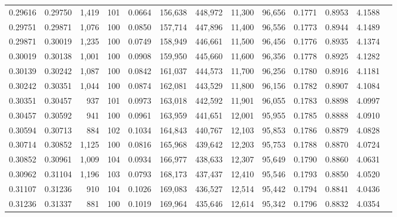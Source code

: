 \begin{tabular}{rrrrrrrrrrrrr}
0.29616 & 0.29750 & 1,419 & 101 &                                     0.0664 & 156,638 & 448,972 &  11,300 &  96,656 & 0.1771 & 0.8953 & 4.1588 \\
0.29751 & 0.29871 & 1,076 & 100 &                                     0.0850 & 157,714 & 447,896 &  11,400 &  96,556 & 0.1773 & 0.8944 & 4.1489 \\
0.29871 & 0.30019 & 1,235 & 100 &                                     0.0749 & 158,949 & 446,661 &  11,500 &  96,456 & 0.1776 & 0.8935 & 4.1374 \\
0.30019 & 0.30138 & 1,001 & 100 &                                     0.0908 & 159,950 & 445,660 &  11,600 &  96,356 & 0.1778 & 0.8925 & 4.1282 \\
0.30139 & 0.30242 & 1,087 & 100 &                                     0.0842 & 161,037 & 444,573 &  11,700 &  96,256 & 0.1780 & 0.8916 & 4.1181 \\
0.30242 & 0.30351 & 1,044 & 100 &                                     0.0874 & 162,081 & 443,529 &  11,800 &  96,156 & 0.1782 & 0.8907 & 4.1084 \\
0.30351 & 0.30457 &   937 & 101 &                                     0.0973 & 163,018 & 442,592 &  11,901 &  96,055 & 0.1783 & 0.8898 & 4.0997 \\
0.30457 & 0.30592 &   941 & 100 &                                     0.0961 & 163,959 & 441,651 &  12,001 &  95,955 & 0.1785 & 0.8888 & 4.0910 \\
0.30594 & 0.30713 &   884 & 102 &                                     0.1034 & 164,843 & 440,767 &  12,103 &  95,853 & 0.1786 & 0.8879 & 4.0828 \\
0.30714 & 0.30852 & 1,125 & 100 &                                     0.0816 & 165,968 & 439,642 &  12,203 &  95,753 & 0.1788 & 0.8870 & 4.0724 \\
0.30852 & 0.30961 & 1,009 & 104 &                                     0.0934 & 166,977 & 438,633 &  12,307 &  95,649 & 0.1790 & 0.8860 & 4.0631 \\
0.30962 & 0.31104 & 1,196 & 103 &                                     0.0793 & 168,173 & 437,437 &  12,410 &  95,546 & 0.1793 & 0.8850 & 4.0520 \\
0.31107 & 0.31236 &   910 & 104 &                                     0.1026 & 169,083 & 436,527 &  12,514 &  95,442 & 0.1794 & 0.8841 & 4.0436 \\
0.31236 & 0.31337 &   881 & 100 &                                     0.1019 & 169,964 & 435,646 &  12,614 &  95,342 & 0.1796 & 0.8832 & 4.0354 \\

\end{tabular}
